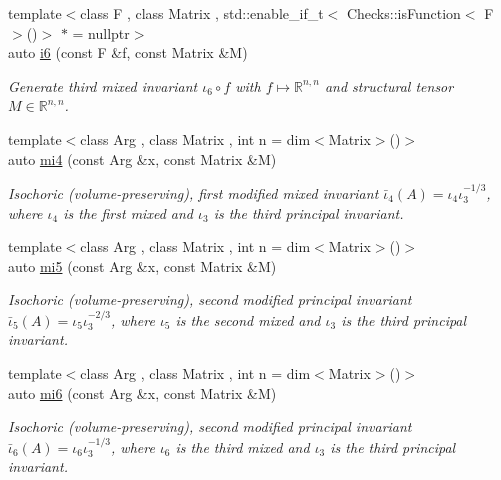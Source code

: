 \begin{DoxyCompactItemize}
{\footnotesize template$<$class F , class Matrix , std\-::enable\-\_\-if\-\_\-t$<$ Checks\-::is\-Function$<$ F $>$()$>$ $\ast$  = nullptr$>$ }\\auto \hyperlink{group__InvariantGroup_ga2536c80df733bb3e089487202c3688c1}{i6} (const \-F \&f, const \-Matrix \&\-M)
\begin{DoxyCompactList}\small\item\em \-Generate third mixed invariant $ \iota_6\circ f $ with $f\mapsto\mathbb{R}^{n,n}$ and structural tensor $M\in\mathbb{R}^{n,n}$. \end{DoxyCompactList}\item 
{\footnotesize template$<$class Arg , class Matrix , int n = dim$<$\-Matrix$>$()$>$ }\\auto \hyperlink{group__InvariantGroup_ga7ee54c5d056877bdefefb8e54ad17791}{mi4} (const \-Arg \&x, const \-Matrix \&\-M)
\begin{DoxyCompactList}\small\item\em \-Isochoric (volume-\/preserving), first modified mixed invariant $ \bar\iota_4(A)=\iota_4\iota_3^{-1/3} $, where $\iota_4$ is the first mixed and $\iota_3$ is the third principal invariant. \end{DoxyCompactList}\item 
{\footnotesize template$<$class Arg , class Matrix , int n = dim$<$\-Matrix$>$()$>$ }\\auto \hyperlink{group__InvariantGroup_ga189bc682b34d13902da335c5eb502faa}{mi5} (const \-Arg \&x, const \-Matrix \&\-M)
\begin{DoxyCompactList}\small\item\em \-Isochoric (volume-\/preserving), second modified principal invariant $ \bar\iota_5(A)=\iota_5\iota_3^{-2/3} $, where $\iota_5$ is the second mixed and $\iota_3$ is the third principal invariant. \end{DoxyCompactList}\item 
{\footnotesize template$<$class Arg , class Matrix , int n = dim$<$\-Matrix$>$()$>$ }\\auto \hyperlink{group__InvariantGroup_ga3e451f9e15fa95080f81d0c0f69f93e6}{mi6} (const \-Arg \&x, const \-Matrix \&\-M)
\begin{DoxyCompactList}\small\item\em \-Isochoric (volume-\/preserving), second modified principal invariant $ \bar\iota_6(A)=\iota_6\iota_3^{-1/3} $, where $\iota_6$ is the third mixed and $\iota_3$ is the third principal invariant. \end{DoxyCompactList}\item 

\end{DoxyCompactItemize}
